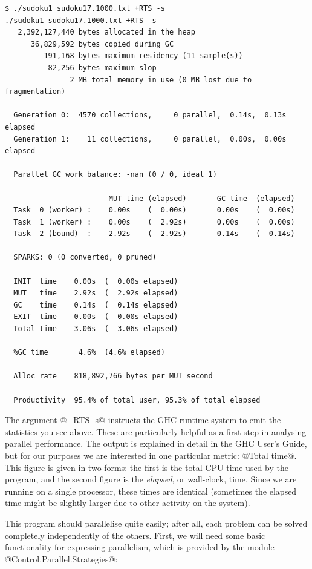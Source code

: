 {\small \begin{verbatim}
$ ./sudoku1 sudoku17.1000.txt +RTS -s
./sudoku1 sudoku17.1000.txt +RTS -s 
   2,392,127,440 bytes allocated in the heap
      36,829,592 bytes copied during GC
         191,168 bytes maximum residency (11 sample(s))
          82,256 bytes maximum slop
               2 MB total memory in use (0 MB lost due to fragmentation)

  Generation 0:  4570 collections,     0 parallel,  0.14s,  0.13s elapsed
  Generation 1:    11 collections,     0 parallel,  0.00s,  0.00s elapsed

  Parallel GC work balance: -nan (0 / 0, ideal 1)

                        MUT time (elapsed)       GC time  (elapsed)
  Task  0 (worker) :    0.00s    (  0.00s)       0.00s    (  0.00s)
  Task  1 (worker) :    0.00s    (  2.92s)       0.00s    (  0.00s)
  Task  2 (bound)  :    2.92s    (  2.92s)       0.14s    (  0.14s)

  SPARKS: 0 (0 converted, 0 pruned)

  INIT  time    0.00s  (  0.00s elapsed)
  MUT   time    2.92s  (  2.92s elapsed)
  GC    time    0.14s  (  0.14s elapsed)
  EXIT  time    0.00s  (  0.00s elapsed)
  Total time    3.06s  (  3.06s elapsed)

  %GC time       4.6%  (4.6% elapsed)

  Alloc rate    818,892,766 bytes per MUT second

  Productivity  95.4% of total user, 95.3% of total elapsed
\end{verbatim}}

\noindent The argument @+RTS -s@ instructs the GHC runtime system to
emit the statistics you see above. These are particularly helpful as a
first step in analysing parallel performance.  The output is explained
in detail in the GHC User's Guide, but for our purposes we are
interested in one particular metric: @Total time@.  This figure is
given in two forms: the first is the total CPU time used by the
program, and the second figure is the \emph{elapsed}, or wall-clock,
time.  Since we are running on a single processor, these times are
identical (sometimes the elapsed time might be slightly larger due to
other activity on the system).

This program should parallelise quite easily; after all, each problem
can be solved completely independently of the others.  First, we
will need some basic functionality for expressing parallelism, which
is provided by the module @Control.Parallel.Strategies@:

